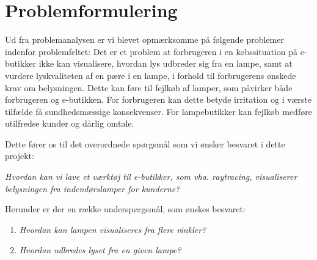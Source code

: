 \section{Problemformulering}

Ud fra problemanalysen er vi blevet opmærksomme på følgende problemer indenfor problemfeltet:
Det er et problem at forbrugeren i en købssituation på e-butikker ikke kan visualisere, hvordan lys udbreder sig fra en lampe, samt at vurdere lyskvaliteten af en pære i en lampe, i forhold til forbrugerens ønskede krav om belysningen. Dette kan føre til fejlkøb af lamper, som påvirker både forbrugeren og e-butikken. For forbrugeren kan dette betyde irritation og i værste tilfælde få sundhedsmæssige konsekvenser. For lampebutikker kan fejlkøb medføre utilfredse kunder og dårlig omtale. 

Dette fører os til det overordnede spørgsmål som vi ønsker besvaret i dette projekt:

\textit{Hvordan kan vi lave et værktøj til e-butikker, som vha. raytracing, visualiserer belysningen fra indendørslamper for kunderne?}

Herunder er der en række underspørgsmål, som ønskes besvaret:

\begin{enumerate}

\item \textit{Hvordan kan lampen visualiseres fra flere vinkler?}
\item \textit{Hvordan udbredes lyset fra en given lampe?}

\end{enumerate}